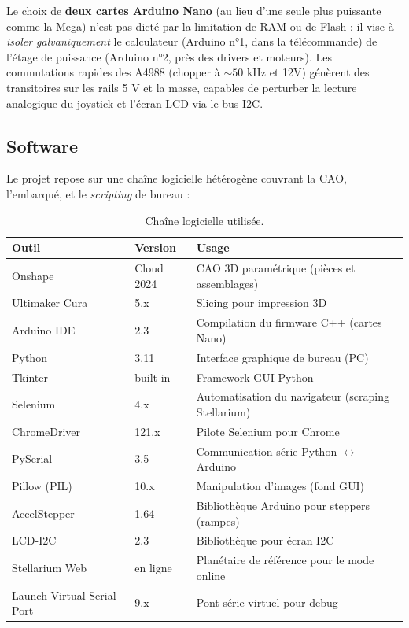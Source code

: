 \documentclass[12pt,a4paper]{report}
\begin{document}
\begin{remarque}
Le choix de \textbf{deux cartes Arduino Nano} (au lieu d'une seule plus puissante comme la Mega) n'est pas dicté par la limitation de RAM ou de Flash : il vise à \textit{isoler galvaniquement} le calculateur (Arduino n°1, dans la télécommande) de l'étage de puissance (Arduino n°2, près des drivers et moteurs). Les commutations rapides des A4988 (chopper à $\sim 50$ kHz et 12V) génèrent des transitoires sur les rails 5 V et la masse, capables de perturber la lecture analogique du joystick et l'écran LCD via le bus I2C.
\end{remarque}
\newpage
\subsection{Software}
Le projet repose sur une chaîne logicielle hétérogène couvrant la CAO, l'embarqué, et le \textit{scripting} de bureau :

\begin{table}[H]
    \centering
    \caption{Chaîne logicielle utilisée.}
    \label{tab:soft}
    \begin{tabular}{|l|l|p{6cm}|}
        \hline
        \textbf{Outil} & \textbf{Version} & \textbf{Usage} \\
        \hline
        Onshape & Cloud 2024 & CAO 3D paramétrique (pièces et assemblages) \\
        Ultimaker Cura & 5.x & Slicing pour impression 3D \\
        Arduino IDE & 2.3 & Compilation du firmware C++ (cartes Nano) \\
        Python & 3.11 & Interface graphique de bureau (PC) \\
        Tkinter & built-in & Framework GUI Python \\
        Selenium & 4.x & Automatisation du navigateur (scraping Stellarium) \\
        ChromeDriver & 121.x & Pilote Selenium pour Chrome \\
        PySerial & 3.5 & Communication série Python $\leftrightarrow$ Arduino \\
        Pillow (PIL) & 10.x & Manipulation d'images (fond GUI) \\
        AccelStepper & 1.64 & Bibliothèque Arduino pour steppers (rampes) \\
        LCD-I2C & 2.3 & Bibliothèque pour écran I2C \\
        Stellarium Web & en ligne & Planétaire de référence pour le mode online \\
        Launch Virtual Serial Port & 9.x & Pont série virtuel pour debug \\
        \hline
    \end{tabular}
\end{table}
\end{document}
